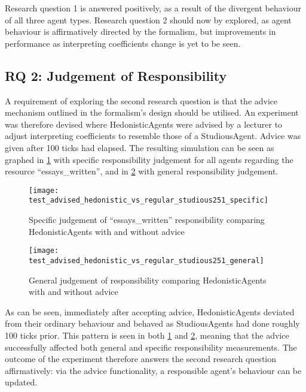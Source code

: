 Research question 1 is answered positively, as a result of the divergent behaviour of all three agent types. Research question 2 should now by explored, as agent behaviour is affirmatively directed by the formalism, but improvements in performance as interpreting coefficients change is yet to be seen.\par

\subsection{RQ 2: Judgement of Responsibility}\label{subsec:RQ2}
A requirement of exploring the second research question is that the advice mechanism outlined in the formalism's design should be utilised. An experiment was therefore devised where HedonisticAgents were advised by a lecturer to adjust interpreting coefficients to resemble those of a StudiousAgent. Advice was given after 100 ticks had elapsed. The resulting simulation can be seen as graphed in \cref{fig:specific_advice} with specific responsibility judgement for all agents regarding the resource ``essays\_written'', and in \cref{fig:general_advice} with general responsibility judgement.

\begin{figure}[h]
    \centering
    \texttt{[image: test\_advised\_hedonistic\_vs\_regular\_studious251\_specific]}
    \caption{Specific judgement of ``essays\_written'' responsibility comparing HedonisticAgents with and without advice}
    \label{fig:specific_advice}
\end{figure}

\begin{figure}[h]
    \centering
    \texttt{[image: test\_advised\_hedonistic\_vs\_regular\_studious251\_general]}
    \caption{General judgement of responsibility comparing HedonisticAgents with and without advice}
    \label{fig:general_advice}
\end{figure}

As can be seen, immediately after accepting advice, HedonisticAgents deviated from their ordinary behaviour and behaved as StudiousAgents had done roughly 100 ticks prior. This pattern is seen in both \cref{fig:specific_advice} and \cref{fig:general_advice}, meaning that the advice successfully affected both general and specific responsibility measurements. The outcome of the experiment therefore answers the second research question affirmatively: via the advice functionality, a responsible agent's behaviour can be updated.\par

